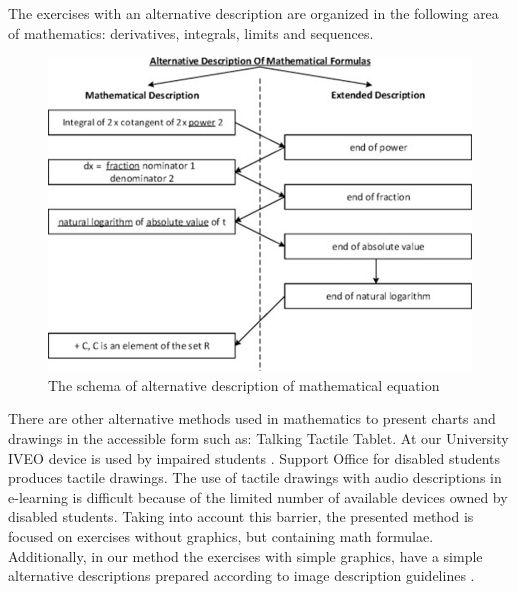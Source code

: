 \documentclass[12pt,1p]{elsarticle}
\begin{document}
	The exercises with an alternative description are organized in the following area of mathematics: derivatives, integrals, limits and sequences.
	
\begin{figure}[t]
\centering
\includegraphics[width=5in]{./pics/1}
\caption{The schema of alternative description of mathematical equation}
\label{fig01}
\end{figure}

	There are other alternative methods used in mathematics to present charts and drawings in the accessible form such as: Talking Tactile Tablet. At our University IVEO device is used by impaired students \cite{viewplus}. Support Office for disabled students produces tactile drawings. The use of tactile drawings with audio descriptions in e-learning is difficult because of the limited number of available devices owned by disabled students. Taking into account this barrier, the presented method is focused on exercises without graphics, but containing math formulae. Additionally, in our method the exercises with simple graphics, have a simple alternative descriptions prepared according to image description guidelines \cite{diagram}.
	
\end{document}
